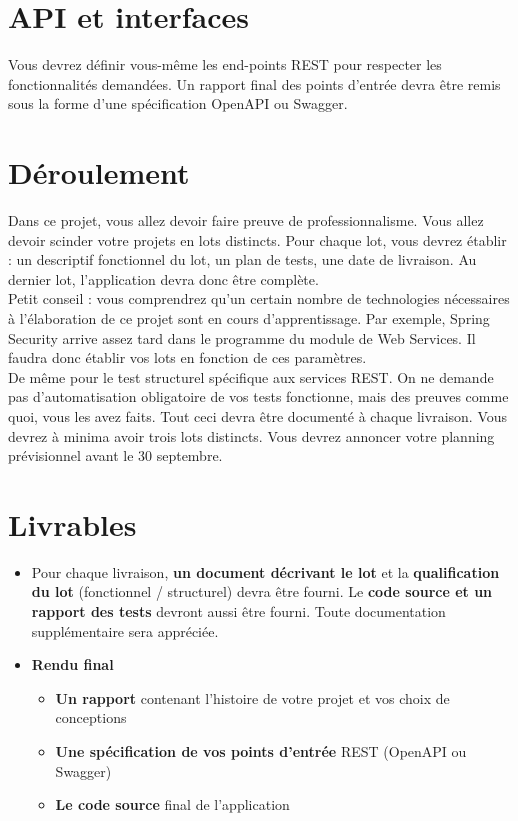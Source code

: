 \documentclass{article}%
\begin{document}

\section{API et interfaces}

Vous devrez définir vous-même les end-points REST pour respecter les fonctionnalités demandées.
Un rapport final des points d'entrée devra être remis sous la forme d'une spécification OpenAPI ou Swagger.


\section{Déroulement}

Dans ce projet, vous allez devoir faire preuve de professionnalisme. Vous allez devoir scinder votre
projets en lots distincts. Pour chaque lot, vous devrez établir : un descriptif fonctionnel du lot, un
plan de tests, une date de livraison. Au dernier lot, l’application devra donc être complète.\\

Petit conseil : vous comprendrez qu'un certain nombre de technologies nécessaires à l'élaboration de ce projet sont en cours d’apprentissage. Par exemple, Spring Security arrive assez tard dans le programme du module de Web Services. Il faudra donc établir vos lots en fonction de ces paramètres.\\ 

De même pour le test structurel spécifique aux services REST. On ne demande pas d’automatisation obligatoire de vos tests fonctionne, mais des preuves comme quoi, vous les avez faits. Tout ceci devra être documenté à chaque livraison. Vous devrez à minima avoir trois lots distincts. Vous devrez annoncer votre planning prévisionnel avant le 30 septembre.


\section{Livrables}

\begin{itemize}
\item Pour chaque livraison, \textbf{un document décrivant le lot} et la \textbf{qualification du lot} (fonctionnel / structurel) devra être fourni. Le \textbf{code source et un rapport des tests} devront aussi être fourni. Toute documentation supplémentaire sera appréciée.
\item \textbf{Rendu final}
\begin{itemize}
    \item \textbf{Un rapport} contenant l'histoire de votre projet et vos choix de conceptions
    \item \textbf{Une spécification de vos points d'entrée} REST (OpenAPI ou Swagger)
    \item \textbf{Le code source} final de l'application
\end{itemize}
\end{itemize}
\end{document}
